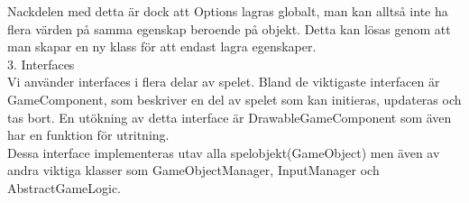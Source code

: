 Nackdelen med detta är dock att Options lagras globalt, man kan alltså inte ha flera värden på samma egenskap beroende på objekt. Detta kan lösas genom att man skapar en ny klass för att endast lagra egenskaper.\\
\vspace{11pt}
3. Interfaces\\
Vi använder interfaces i flera delar av spelet. Bland de viktigaste interfacen är GameComponent, som beskriver en del av spelet som kan initieras, updateras och tas bort. En utökning av detta interface är DrawableGameComponent som även har en funktion för utritning.\\
Dessa interface implementeras utav alla spelobjekt(GameObject) men även av andra viktiga klasser som GameObjectManager, InputManager och AbstractGameLogic.\\
